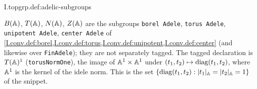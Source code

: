 \begin{definition}
\end{definition}
\begin{tfformal}{I.topgrp.def:adelic-subgroups}
\begin{tffidelity}
$B(\mathbb{A})$, $T(\mathbb{A})$, $N(\mathbb{A})$, $Z(\mathbb{A})$ are the subgroups \texttt{borel Adele}, \texttt{torus Adele}, \texttt{unipotent Adele}, \texttt{center Adele} of \cref{I.conv.def:borel,I.conv.def:torus,I.conv.def:unipotent,I.conv.def:center} (and likewise over \texttt{FinAdele}); they are not separately tagged. The tagged declaration is $T(\mathbb{A})^1$ (\texttt{torusNormOne}), the image of $\mathbb{A}^1\times\mathbb{A}^1$ under $(t_1,t_2)\mapsto\operatorname{diag}(t_1,t_2)$, where $\mathbb{A}^1$ is the kernel of the idele norm. This is the set $\{\operatorname{diag}(t_1,t_2):\lvert t_1\rvert_{\mathbb{A}}=\lvert t_2\rvert_{\mathbb{A}}=1\}$ of the snippet.
\end{tffidelity}
\end{tfformal}

